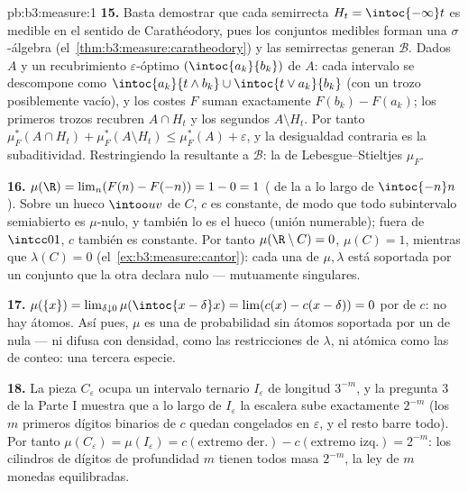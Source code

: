 \begin{solution}{pb:b3:measure:1}
\textbf{15.} Basta demostrar que cada semirrecta $H_t =
\intoc{-\infty}t$ es medible en el sentido de Carathéodory, pues los
conjuntos medibles forman una $\sigma$-álgebra
(el~\cref{thm:b3:measure:caratheodory}) y las semirrectas generan
$\mathcal B$. Dados $A$ y un recubrimiento $\varepsilon$-óptimo
$(\intoc{a_k}{b_k})$ de $A$: cada intervalo se descompone como
$\intoc{a_k}{t\wedge b_k} \cup \intoc{t \vee a_k}{b_k}$ (con un trozo
posiblemente vacío), y los costes $F$ suman exactamente
$F(b_k) - F(a_k)$; los primeros trozos recubren $A \cap H_t$ y los
segundos $A \setminus H_t$. Por tanto $\mu_F^*(A\cap H_t) +
\mu_F^*(A\setminus H_t) \leq \mu_F^*(A) + \varepsilon$, y la desigualdad
contraria es la subaditividad. Restringiendo la
 resultante a $\mathcal B$: la
 de Lebesgue--Stieltjes $\mu_F$.

\textbf{16.} $\mu(\R) = \lim_n(F(n) - F(-n)) = 1 - 0 = 1$
( de la
 a lo largo de $\intoc{-n}n$).
Sobre un hueco $\intoo uv$ de $C$, $c$ es constante, de modo que todo
subintervalo semiabierto es $\mu$-nulo, y también lo es el hueco (unión
numerable); fuera de $\intcc01$, $c$ también es constante. Por tanto
$\mu(\R\setminus C) = 0$, $\mu(C) = 1$, mientras que $\lambda(C) =
0$ (el~\cref{ex:b3:measure:cantor}): cada una de $\mu, \lambda$ está
soportada por un conjunto que la otra declara nulo --- mutuamente
singulares.

\textbf{17.} $\mu(\{x\}) = \lim_{\delta\downarrow0}
\mu(\intoc{x-\delta}x) = \lim(c(x) - c(x-\delta)) = 0$ por
 de $c$: no hay átomos.
Así pues, $\mu$ es una  de
probabilidad sin átomos soportada por un
 de  nula
--- ni difusa con densidad, como las restricciones de $\lambda$, ni
atómica como las  de conteo: una
tercera especie.

\textbf{18.} La pieza $C_\varepsilon$ ocupa un intervalo ternario
$I_\varepsilon$ de longitud $3^{-m}$, y la pregunta 3 de la Parte I
muestra que a lo largo de $I_\varepsilon$ la escalera sube exactamente
$2^{-m}$ (los $m$ primeros dígitos binarios de $c$ quedan congelados en
$\varepsilon$, y el resto barre todo). Por tanto
$\mu(C_\varepsilon) = \mu(I_\varepsilon) =
c(\text{extremo der.}) - c(\text{extremo izq.}) = 2^{-m}$: los cilindros de
dígitos de profundidad $m$ tienen todos masa $2^{-m}$, la ley de $m$
monedas equilibradas.


\end{solution}
